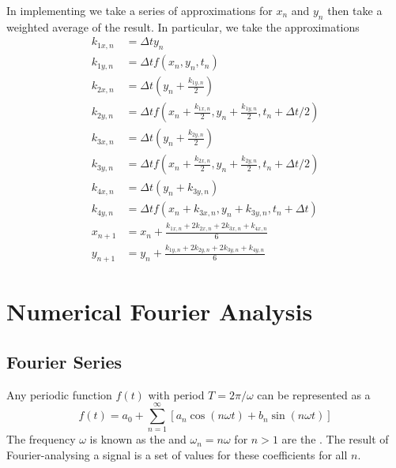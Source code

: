 \documentclass[12pt, a4paper, oneside, openright, titlepage]{book}
\begin{document}
\begin{proc}
        In implementing we take a series of approximations for $x_n$ and $y_n$ then take a weighted average of the result. In particular, we take the approximations \begin{align}
                k_{1x,n} &= \Delta t y_n \\
                k_{1y,n} &= \Delta t f(x_n,y_n,t_n) \\
                k_{2x,n} &= \Delta t \left(y_n+ \frac{k_{1y,n}}{2}\right) \\
                k_{2y,n} &= \Delta tf\left(x_n + \frac{k_{1x,n}}{2}, y_n + \frac{k_{1y,n}}{2}, t_n + \Delta t/2\right) \\
                k_{3x,n} &= \Delta t\left(y_n+ \frac{k_{2y,n}}{2}\right) \\
                k_{3y,n} &= \Delta t f\left(x_n + \frac{k_{2x,n}}{2}, y_n + \frac{k_{2y,n}}{2}, t_n + \Delta t/2\right) \\
                k_{4x,n} &= \Delta t \left(y_n + k_{3y,n}\right)\\
                k_{4y,n} &= \Delta tf\left(x_n + k_{3x,n}, y_n + k_{3y,n}, t_n + \Delta t\right) \\
                x_{n+1} &= x_n + \frac{k_{1x,n} + 2k_{2x,n} + 2k_{3x,n} + k_{4x,n}}{6} \\
                y_{n+1} &= y_n + \frac{k_{1y,n} + 2k_{2y,n} + 2k_{3y,n} + k_{4y,n}}{6} 
        \end{align}
\end{proc}






\chapter{Numerical Fourier Analysis}


\section{Fourier Series}


\begin{defn}
        Any periodic function $f(t)$ with period $T = 2\pi/\omega$ can be represented as a \begin{equation}
                f(t) = a_0 + \sum_{n=1}^{\infty}\left[a_n\cos(n\omega t) + b_n\sin(n\omega t)\right]
        \end{equation}
        The frequency $\omega$ is known as the  and $\omega_n = n\omega$ for $n >1$ are the . The result of Fourier-analysing a signal is a set of values for these coefficients for all $n$.
\end{defn}
\end{document}
